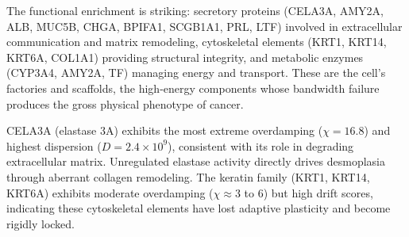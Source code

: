 \documentclass[11pt,letterpaper]{article}
\begin{document}
The functional enrichment is striking: secretory proteins (CELA3A, AMY2A, ALB, MUC5B, CHGA, BPIFA1, SCGB1A1, PRL, LTF) involved in extracellular communication and matrix remodeling, cytoskeletal elements (KRT1, KRT14, KRT6A, COL1A1) providing structural integrity, and metabolic enzymes (CYP3A4, AMY2A, TF) managing energy and transport. These are the cell's factories and scaffolds, the high-energy components whose bandwidth failure produces the gross physical phenotype of cancer.

CELA3A (elastase 3A) exhibits the most extreme overdamping ($\chi = 16.8$) and highest dispersion ($D = 2.4 \times 10^9$), consistent with its role in degrading extracellular matrix. Unregulated elastase activity directly drives desmoplasia through aberrant collagen remodeling. The keratin family (KRT1, KRT14, KRT6A) exhibits moderate overdamping ($\chi \approx 3$ to 6) but high drift scores, indicating these cytoskeletal elements have lost adaptive plasticity and become rigidly locked.
\end{document}
